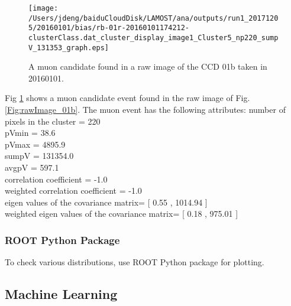 \documentclass[12pt,twoside,letterpaper]{article}
\begin{document}
   \begin{figure}[!htbp]
   \begin{center}
       \texttt{[image: /Users/jdeng/baiduCloudDisk/LAMOST/ana/outputs/run1\_20171205/20160101/bias/rb-01r-20160101174212-clusterClass.dat\_cluster\_display\_image1\_Cluster5\_np220\_sumpV\_131353\_graph.eps]}
       \caption{A muon candidate found in a raw image of the CCD 01b taken in 20160101.}
       \label{Fig:muon_np220_01b}
   \end{center}    
   \end{figure}

Fig \ref{Fig:muon_np220_01b} shows a muon candidate event found in the raw image of Fig. \ref{Fig:rawImage_01b}. The muon event has the following attributes: 
number of pixels in the cluster =  220 \\
pVmin =  38.6\\
pVmax =  4895.9\\
sumpV =  131354.0\\
avgpV =  597.1\\
correlation coefficient          =  -1.0\\
weighted correlation coefficient =  -1.0\\
eigen values of the covariance matrix=          [  0.55 ,  1014.94 ]\\
weighted eigen values of the covariance matrix= [  0.18 ,  975.01 ]\\


\subsubsection{ROOT Python Package}
To check various distributions, use ROOT Python package for plotting.


\subsection{Machine Learning} 
\end{document}
